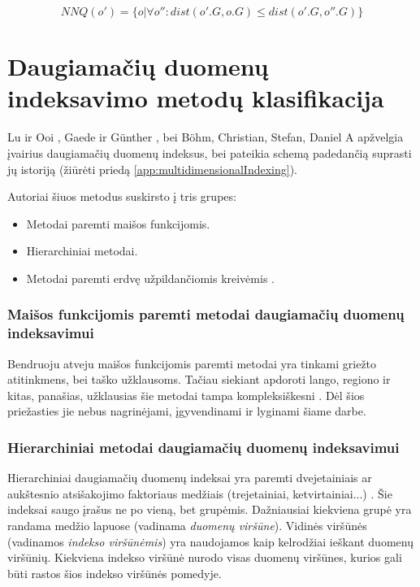 \begin{equation}
	NNQ(o') = \{ o | \forall o'' : dist(o'.G, o.G) \leq dist(o'.G, o''.G) \}
\label{eq:ExactMatchQuery}
\end{equation}




\section{Daugiamačių duomenų indeksavimo metodų klasifikacija}
Lu ir Ooi \cite{lu1993spatial}, Gaede ir Günther \cite{gaede1998multidimensional}, bei B{\"o}hm, Christian, Stefan, Daniel A \cite{bohm2001searching} apžvelgia įvairius daugiamačių duomenų indeksus, bei pateikia schemą padedančią suprasti jų istoriją (žiūrėti priedą \ref{app:multidimensionalIndexing}).

Autoriai šiuos metodus suskirsto į tris grupes:
\begin{itemize}
	\item Metodai paremti maišos funkcijomis.
	\item Hierarchiniai metodai.
	\item Metodai paremti erdvę užpildančiomis kreivėmis \cite{bader2012space}.
\end{itemize}



\subsubsection{Maišos funkcijomis paremti metodai daugiamačių duomenų indeksavimui}

Bendruoju atveju maišos funkcijomis paremti metodai yra tinkami griežto atitinkmens, bei taško užklausoms.
Tačiau siekiant apdoroti lango, regiono ir kitas, panašias, užklausias šie metodai tampa kompleksiškesni \cite{nievergelt1981grid} \cite{tamminen1982excell}.
Dėl šios priežasties jie nebus nagrinėjami, įgyvendinami ir lyginami šiame darbe.


\subsubsection{Hierarchiniai metodai daugiamačių duomenų indeksavimui}
\label{sec:HierarchicalIndices}

Hierarchiniai daugiamačių duomenų indeksai yra paremti dvejetainiais ar aukštesnio atsišakojimo faktoriaus medžiais (trejetainiai, ketvirtainiai...) \cite{gaede1998multidimensional}.
Šie indeksai saugo įrašus ne po vieną, bet grupėmis.
Dažniausiai kiekviena grupė yra randama medžio lapuose (vadinama {\it duomenų viršūne}).
Vidinės viršūnės (vadinamos {\it indekso viršūnėmis}) yra naudojamos kaip kelrodžiai ieškant duomenų viršūnių.
Kiekviena indekso viršūnė nurodo visas duomenų viršūnes, kurios gali būti rastos šios indekso viršūnės pomedyje.

